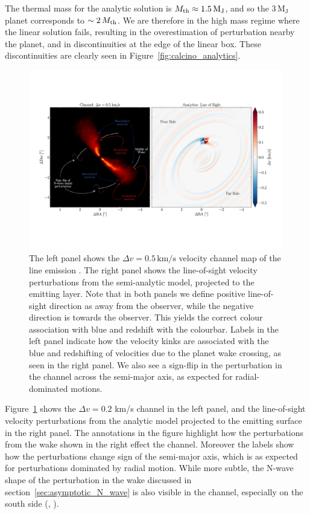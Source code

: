 The thermal mass for the analytic solution is $M_{\rm th} \approx 1.5 \, \mathrm{M_J}$, and so the $3 \, \mathrm{M_J}$ planet corresponds to $\sim 2 \, M_{\rm th}$.
We are therefore in the high mass regime where the linear solution fails, resulting in the overestimation of perturbation nearby the planet, and in discontinuities at the edge of the linear box.
These discontinuities are clearly seen in Figure~\ref{fig:calcino_analytics}.

\begin{figure}
    \centering
    \includegraphics[width = 0.99\textwidth]{figures/calcino_channel_comparison.pdf}
    \caption{The left panel shows the $\Delta v = 0.5 \, \mathrm{km/s}$ velocity channel map of the line emission \citep{oberg2021}. The right panel shows the line-of-sight velocity perturbations from the semi-analytic model, projected to the emitting layer. Note that in both panels we define positive line-of-sight direction as away from the observer, while the negative direction is towards the observer. This yields the correct colour association with blue and redshift with the colourbar. Labels in the left panel indicate how the velocity kinks are associated with the blue and redshifting of velocities due to the planet wake crossing, as seen in the right panel. We also see a sign-flip in the perturbation in the channel across the semi-major axis, as expected for radial-dominated motions.}
    \label{fig:calcino_channel_comparison}
\end{figure}

Figure~\ref{fig:calcino_channel_comparison} shows the  $\Delta v = 0.2$ km/s channel in the left panel, and the line-of-sight velocity perturbations from the analytic model projected to the emitting surface in the right panel.
The annotations in the figure highlight how the perturbations from the wake shown in the right effect the channel.
Moreover the labels show how the perturbations change sign of the semi-major axis, which is as expected for perturbations dominated by radial motion.
While more subtle, the N-wave shape of the perturbation in the wake discussed in section~\ref{sec:asymptotic_N_wave} is also visible in the channel, especially on the south side (\citealt{rafikov2002a}, ).

